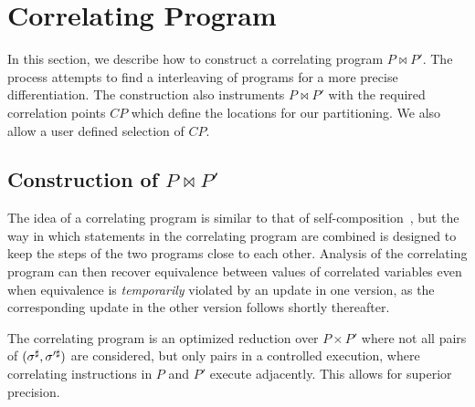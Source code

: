 \section{Correlating Program} 

In this section, we describe how to construct a correlating program $P \bowtie P'$. The process attempts to find a interleaving of programs for a more precise differentiation. The construction also instruments $P \bowtie P'$ with the required correlation points $CP$ which define the locations for our partitioning. We also allow a user defined selection of $CP$.

\subsection{Construction of $P \bowtie P'$ }
The idea of a correlating program is similar to that of
self-composition~\cite{AikenTerauchi05}, but the way in
which statements in the correlating program are combined is designed to
keep the steps of the two programs close to each other. Analysis of the correlating program can then recover equivalence between values of correlated variables even when
equivalence is \emph{temporarily} violated by an update in one version, as
the corresponding update in the other version follows shortly thereafter.

The correlating program is an optimized reduction over $P \times P'$ where not all pairs of $(\sigma^\sharp,\sigma'^\sharp)$ are considered, but only pairs in a controlled execution, where correlating instructions in $P$ and $P'$ execute adjacently. This allows for superior precision.

